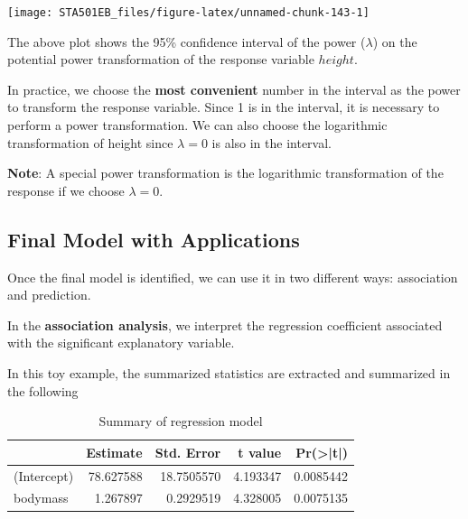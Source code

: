 \documentclass[
]{book}
\newenvironment{Shaded}{\begin{snugshade}}{\end{snugshade}}
\newcommand{\AttributeTok}[1]{\textcolor[rgb]{0.13,0.29,0.53}{#1}}
\newcommand{\FunctionTok}[1]{\textcolor[rgb]{0.13,0.29,0.53}{\textbf{#1}}}
\newcommand{\NormalTok}[1]{#1}
\newcommand{\SpecialCharTok}[1]{\textcolor[rgb]{0.81,0.36,0.00}{\textbf{#1}}}
\newcommand{\StringTok}[1]{\textcolor[rgb]{0.31,0.60,0.02}{#1}}
\begin{document}
\begin{center}\texttt{[image: STA501EB\_files/figure-latex/unnamed-chunk-143-1]} \end{center}

The above plot shows the 95\% confidence interval of the power (\(\lambda\)) on the potential power transformation of the response variable \(height\).

In practice, we choose the \textbf{most convenient} number in the interval as the power to transform the response variable. Since 1 is in the interval, it is necessary to perform a power transformation. We can also choose the logarithmic transformation of height since \(\lambda = 0\) is also in the interval.

\textbf{Note}: A special power transformation is the logarithmic transformation of the response if we choose \(\lambda = 0\).

\hypertarget{final-model-with-applications}{%
\subsection{Final Model with Applications}\label{final-model-with-applications}}

Once the final model is identified, we can use it in two different ways: association and prediction.

In the \textbf{association analysis}, we interpret the regression coefficient associated with the significant explanatory variable.

In this toy example, the summarized statistics are extracted and summarized in the following

\begin{Shaded}
\end{Shaded}

\begin{table}

\caption{\label{tab:unnamed-chunk-144}Summary of regression model}
\centering
\begin{tabular}[t]{l|r|r|r|r}
\hline
  & Estimate & Std. Error & t value & Pr(>|t|)\\
\hline
(Intercept) & 78.627588 & 18.7505570 & 4.193347 & 0.0085442\\
\hline
bodymass & 1.267897 & 0.2929519 & 4.328005 & 0.0075135\\
\hline
\end{tabular}
\end{table}
\end{document}
